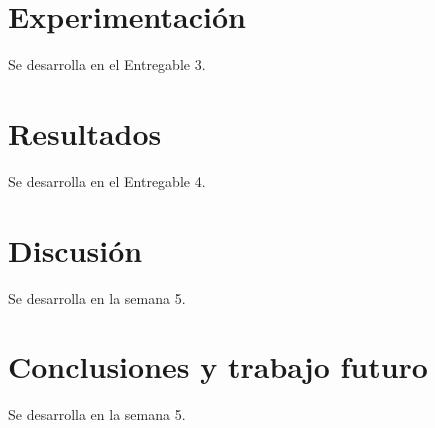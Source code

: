 \documentclass[conference,letterpaper]{IEEEtran}
\begin{document}






\section{Experimentación}
Se desarrolla en el Entregable 3.

\section{Resultados}
Se desarrolla en el Entregable 4.

\section{Discusión}
Se desarrolla en la semana 5.

\section{Conclusiones y trabajo futuro}
Se desarrolla en la semana 5.







\appendices

\end{document}
